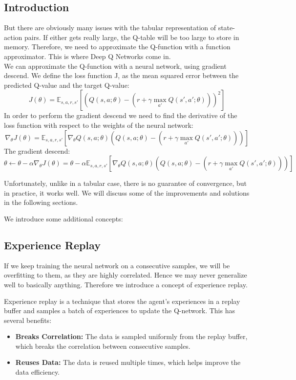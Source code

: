 \documentclass[a4paper,12pt]{article}
\begin{document}
\subsection{Introduction}
But there are obviously many issues with the tabular representation of state-action pairs. If either gets really large, the Q-table will be too large to store in memory. Therefore, we need to approximate the Q-function with a function approximator. This is where Deep Q Networks come in.
\\
We can approximate the Q-function with a neural network, using gradient descend. We define the loss function J, as the mean squared error between the predicted Q-value and the target Q-value:
\[
J(\theta) = \mathbb{E}_{s, a, r, s'} \left[ \left( Q(s, a; \theta) - (r + \gamma \max_{a'} Q(s', a'; \theta)) \right)^2 \right]
\]
In order to perform the gradient descend we need to find the derivative of the loss function with respect to the weights of the neural network:
\[
\nabla_\theta J(\theta) = \mathbb{E}_{s, a, r, s'} \left[ \nabla_\theta Q(s, a; \theta)\left( Q(s, a; \theta) - (r + \gamma \max_{a'} Q(s', a'; \theta)) \right)  \right]
\]
The gradient descend:
\[
\theta \leftarrow \theta - \alpha \nabla_\theta J(\theta)= \theta - \alpha \mathbb{E}_{s, a, r, s'} \left[ \nabla_\theta Q(s, a; \theta)\left( Q(s, a; \theta) - (r + \gamma \max_{a'} Q(s', a'; \theta)) \right)  \right]
\]

Unfortunately, unlike in a tabular case, there is no guarantee of convergence, but in practice, it works well. We will discuss some of the improvements and solutions in the following sections.

We introduce some additional concepts:
\subsection{Experience Replay}
If we keep training the neural network on a consecutive samples, we will be overfitting to them, as they are highly correlated. Hence we may never generalize well to basically anything. Therefore we introduce a concept of experience replay.

Experience replay is a technique that stores the agent's experiences in a replay buffer and samples a batch of experiences to update the Q-network. This has several benefits:
\begin{itemize}
    \item \textbf{Breaks Correlation:} The data is sampled uniformly from the replay buffer, which breaks the correlation between consecutive samples.
    \item \textbf{Reuses Data:} The data is reused multiple times, which helps improve the data efficiency.
\end{itemize}
\end{document}
